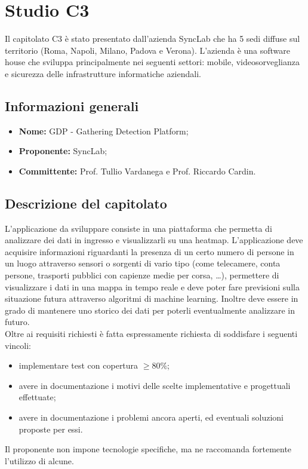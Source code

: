 \section{Studio C3} \label{_c3}
Il capitolato C3 è stato presentato dall'azienda SyncLab che ha 5 sedi diffuse sul territorio (Roma, Napoli, Milano, Padova e Verona). L'azienda è una software house che sviluppa principalmente nei seguenti settori: mobile, videosorveglianza e sicurezza delle infrastrutture informatiche aziendali.

\subsection{Informazioni generali}
\begin{itemize}
    \item \textbf{Nome:} GDP - Gathering Detection Platform;
    \item \textbf{Proponente:} SyncLab;
    \item \textbf{Committente:} Prof. Tullio Vardanega e Prof. Riccardo Cardin.
\end{itemize}

\subsection{Descrizione del capitolato}
L'applicazione da sviluppare consiste in una piattaforma che permetta di analizzare dei dati in ingresso e visualizzarli su una heatmap. L'applicazione deve acquisire informazioni riguardanti la presenza di un certo numero di persone in un luogo attraverso sensori o sorgenti di vario tipo (come telecamere, conta persone, trasporti pubblici con capienze medie per corsa, …), permettere di visualizzare i dati in una mappa in tempo reale e deve poter fare previsioni sulla situazione futura attraverso algoritmi di machine learning. Inoltre deve essere in grado di mantenere uno storico dei dati per poterli eventualmente analizzare in futuro.\\
Oltre ai requisiti richiesti è fatta espressamente richiesta di soddisfare i seguenti vincoli:
\begin{itemize}
    \item implementare test con copertura $\geq 80\%$;
    \item avere in documentazione i motivi delle scelte implementative e progettuali effettuate;
    \item avere in documentazione i problemi ancora aperti, ed eventuali soluzioni proposte per essi.
\end{itemize}
Il proponente non impone tecnologie specifiche, ma ne raccomanda fortemente l’utilizzo di alcune.

